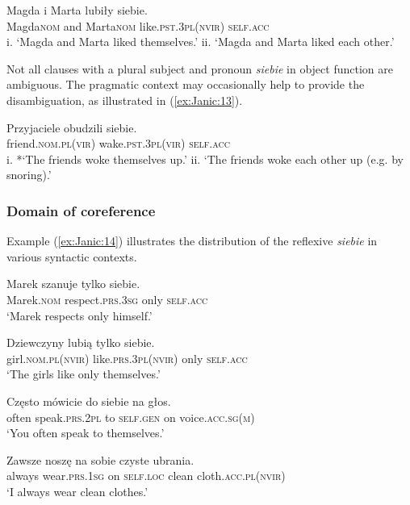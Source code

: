 \documentclass[output=paper]{langscibook}
\begin{document}
\ex \label{ex:Janic:12b}
\gll Magda		 i	Marta	 	lubiły			 siebie. \\			
 Magda\textsc{nom}		and	Marta\textsc{nom}		like.\textsc{pst.3pl(nvir)}	\textsc{self.acc}\\	
\glt i. ‘Magda and Marta liked themselves.’
\glt ii. ‘Magda and Marta liked each other.’ \citep[263--264]{Nedjalkov2007}
\z 
\z 


Not all clauses with a plural subject and pronoun \textit{siebie} in object function are ambiguous. The pragmatic context may occasionally help to provide the disambiguation, as illustrated in (\ref{ex:Janic:13}). 

\ea \label{ex:Janic:13}
\gll Przyjaciele	 obudzili		 siebie.\\	
	 friend.\textsc{nom.pl(vir)}	 wake.\textsc{pst.3pl(vir)}	 \textsc{self.acc}\\					
\glt i. *‘The friends woke themselves up.’
\glt ii. ‘The friends woke each other up (e.g. by snoring).’	 \citep[264]{Nedjalkov2007}
\z 

\subsubsection{Domain of coreference} \label{sec:Janic:3.1.2}

Example (\ref{ex:Janic:14}) illustrates the distribution of the reflexive \textit{siebie} in various syntactic contexts.

\ea \label{ex:Janic:14}
\ea \label{ex:Janic:14a}
\gll Marek	 szanuje		 tylko		siebie.\\
		Marek.\textsc{nom}	respect.\textsc{prs.3sg}	only		\textsc{self.acc} \\
\glt ‘Marek respects only himself.’ 		

\ex \label{ex:Janic:14b}
\gll Dziewczyny	 lubią			 tylko		siebie.\\
		girl.\textsc{nom.pl(nvir)}	like.\textsc{prs.3pl(nvir)}	only		\textsc{self.acc}\\
\glt ‘The girls like only themselves.’

\ex \label{ex:Janic:14c}
\gll Często 	mówicie		 do 	siebie 		 na 	głos.\\	
		often	speak.\textsc{prs.2pl}	to	\textsc{self.gen}	on	voice.\textsc{acc.sg(m)}\\
\glt ‘You often speak to themselves.’

\ex \label{ex:Janic:14d}
\gll Zawsze	noszę		 na	sobie		 czyste		ubrania.\\
		always	wear.\textsc{prs.1sg}	on	\textsc{self.loc}	clean		cloth.\textsc{acc.pl(nvir)}\\
\glt ‘I always wear clean clothes.’
\end{document}
